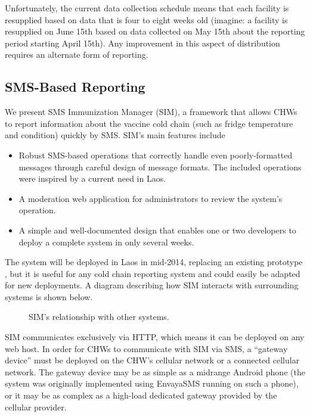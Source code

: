 \documentclass{acm_proc_article-sp}
\begin{document}
Unfortunately, the current data collection schedule means that each facility is resupplied based on data that is four to eight weeks old (imagine: a facility is resupplied on June 15th based on data collected on May 15th about the reporting period starting April 15th). Any improvement in this aspect of distribution requires an alternate form of reporting. 

\subsection{SMS-Based Reporting}

We present SMS Immunization Manager (SIM), a framework that allows CHWs to report information about the vaccine cold chain (such as fridge temperature and condition) quickly by SMS. SIM's main features include 

\begin{itemize}
\item Robust SMS-based operations that correctly handle even poorly-formatted messages through careful design of message formats. The included operations were inspired by a current need in Laos.
\item A moderation web application for administrators to review the system's operation.
\item A simple and well-documented design that enables one or two developers to deploy a complete system in only several weeks.
\end{itemize}

The system will be deployed in Laos in mid-2014, replacing an existing prototype \cite{unicefstories}, but it is useful for any cold chain reporting system and could easily be adapted for new deployments. A diagram describing how SIM interacts with surrounding systems is shown below.

\begin{figure*}
\centering
{}
\caption{SIM's relationship with other systems.}
\end{figure*}

SIM communicates exclusively via HTTP, which means it can be deployed on any web host. In order for CHWs to communicate with SIM via SMS, a ``gateway device'' must be deployed on the CHW's cellular network or a connected cellular network. The gateway device may be as simple as a midrange Android phone (the system was originally implemented using EnvayaSMS running on such a phone), or it may be as complex as a high-load dedicated gateway provided by the cellular provider. 
\end{document}
